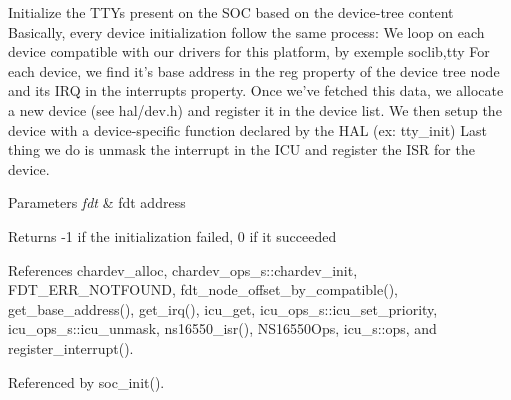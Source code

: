 Initialize the T\-T\-Ys present on the S\-O\-C based on the device-\/tree content Basically, every device initialization follow the same process\-: We loop on each device compatible with our drivers for this platform, by exemple soclib,tty For each device, we find it's base address in the reg property of the device tree node and its I\-R\-Q in the interrupts property. Once we've fetched this data, we allocate a new device (see hal/dev.\-h) and register it in the device list. We then setup the device with a device-\/specific function declared by the H\-A\-L (ex\-: tty\-\_\-init) Last thing we do is unmask the interrupt in the I\-C\-U and register the I\-S\-R for the device. 


\begin{DoxyParams}{Parameters}
{\em fdt} & fdt address \\
\hline
\end{DoxyParams}
\begin{DoxyReturn}{Returns}
-\/1 if the initialization failed, 0 if it succeeded 
\end{DoxyReturn}


References chardev\-\_\-alloc, chardev\-\_\-ops\-\_\-s\-::chardev\-\_\-init, F\-D\-T\-\_\-\-E\-R\-R\-\_\-\-N\-O\-T\-F\-O\-U\-N\-D, fdt\-\_\-node\-\_\-offset\-\_\-by\-\_\-compatible(), get\-\_\-base\-\_\-address(), get\-\_\-irq(), icu\-\_\-get, icu\-\_\-ops\-\_\-s\-::icu\-\_\-set\-\_\-priority, icu\-\_\-ops\-\_\-s\-::icu\-\_\-unmask, ns16550\-\_\-isr(), N\-S16550\-Ops, icu\-\_\-s\-::ops, and register\-\_\-interrupt().



Referenced by soc\-\_\-init().


